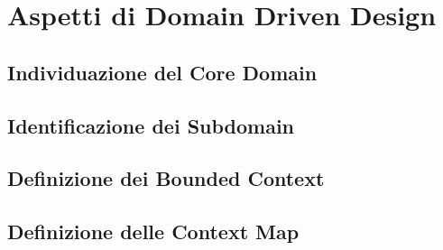 \chapter{Aspetti di Domain Driven Design}
    \section{Individuazione del Core Domain}
 
    \section{Identificazione dei Subdomain}
    \section{Definizione dei Bounded Context}
    \section{Definizione delle Context Map}